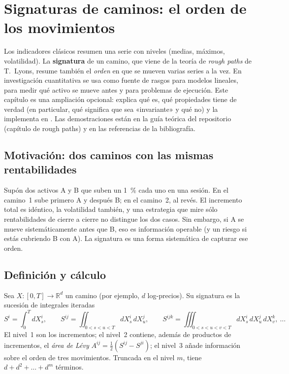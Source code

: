 \chapter{Signaturas de caminos: el orden de los movimientos}\label{cap:signaturas}

Los indicadores clásicos resumen una serie con niveles (medias, máximos, volatilidad). La
\textbf{signatura} de un camino, que viene de la teoría de \emph{rough paths} de T.~Lyons, resume
también el \emph{orden} en que se mueven varias series a la vez. En investigación cuantitativa se usa
como fuente de rasgos para modelos lineales, para medir qué activo se mueve antes y para problemas de
ejecución. Este capítulo es una ampliación opcional: explica qué es, qué propiedades tiene de verdad
(en particular, qué significa que sea «invariante» y qué no) y la implementa en
. Las demostraciones están en la guía teórica del repositorio (capítulo de rough
paths) y en las referencias de la bibliografía.

\section{Motivación: dos caminos con las mismas rentabilidades}
Supón dos activos A y B que suben un 1~\% cada uno en una sesión. En el camino~1 sube primero A y
después B; en el camino~2, al revés. El incremento total es idéntico, la volatilidad también, y una
estrategia que mire sólo rentabilidades de cierre a cierre no distingue los dos casos. Sin embargo, si A
se mueve sistemáticamente antes que B, eso es información operable (y un riesgo si estás cubriendo B
con A). La signatura es una forma sistemática de capturar ese orden.

\section{Definición y cálculo}
Sea $X:[0,T]\to\mathbb R^d$ un camino (por ejemplo, $d$ log-precios). Su signatura es la sucesión de
integrales iteradas
\begin{equation}\label{eq:signatura}
S^{i}=\int_0^T dX^i_s,\qquad
S^{ij}=\iint_{0<s<u<T} dX^i_s\,dX^j_u,\qquad
S^{ijk}=\iiint_{0<s<u<v<T} dX^i_s\,dX^j_u\,dX^k_v,\ \dots
\end{equation}
El nivel~1 son los incrementos; el nivel~2 contiene, además de productos de incrementos, el
\emph{área de Lévy} $A^{ij}=\tfrac12(S^{ij}-S^{ji})$; el nivel~3 añade información sobre el orden de
tres movimientos. Truncada en el nivel $m$, tiene $d+d^2+\dots+d^m$ términos.

